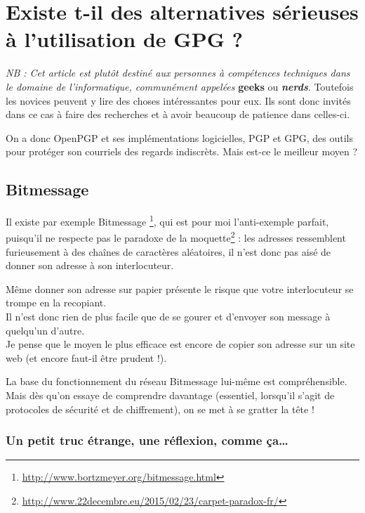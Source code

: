 \chapter{Existe t-il des alternatives sérieuses à l'utilisation de GPG ?}

\emph{NB : Cet article est plutôt destiné aux personnes à compétences
techniques dans le domaine de l'informatique, communément appelées
}\textbf{geeks} ou \textbf{\emph{nerds}}. Toutefois les novices peuvent
y lire des choses intéressantes pour eux. Ils sont donc invités dans ce
cas à faire des recherches et à avoir beaucoup de patience dans
celles-ci.

On a donc OpenPGP et ses implémentations logicielles, PGP et GPG, des
outils pour protéger son courriels des regards indiscrèts. Mais est-ce
le meilleur moyen ?

\section{Bitmessage}\label{bitmessage}

Il existe par exemple Bitmessage
\footnote{\url{http://www.bortzmeyer.org/bitmessage.html}}, qui est
pour moi l'anti-exemple parfait, puisqu'il ne respecte pas le
paradoxe de la moquette\footnote{\url{http://www.22decembre.eu/2015/02/23/carpet-paradox-fr/}} : les adresses ressemblent furieusement à des chaînes de
caractères aléatoires, il n'est donc pas aisé de donner son adresse à son interlocuteur.

Même donner son adresse sur papier présente le risque que votre interlocuteur se trompe en la recopiant.\\Il n'est donc rien de plus
facile que de se gourer et d'envoyer son message à quelqu'un d'autre.\\Je pense que le moyen le plus efficace est encore de copier
son adresse sur un site web (et encore faut-il être prudent !).

La base du fonctionnement du réseau Bitmessage lui-même est compréhensible. Mais dès qu'on essaye de comprendre davantage
(essentiel, lorsqu'il s'agit de protocoles de sécurité et de chiffrement), on se met à se gratter la tête !

\subsection{Un petit truc étrange, une réflexion, comme ça\ldots{}}\label{un-petit-truc-uxe9trange-une-ruxe9flexion-comme-uxe7a}

